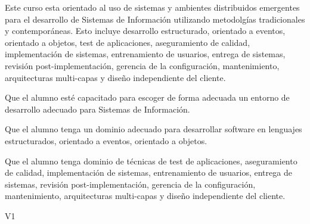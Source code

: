 \begin{syllabus}


\begin{justification}
Este curso esta orientado al uso de sistemas y ambientes distribuidos emergentes para el desarrollo de Sistemas de Información utilizando metodolgías tradicionales y contemporáneas. Esto incluye desarrollo estructurado, orientado a eventos, orientado a objetos, test de aplicaciones, aseguramiento de calidad, implementación de sistemas, entrenamiento de usuarios, entrega de sistemas, revisión post-implementación, gerencia de la configuración, mantenimiento, arquitecturas multi-capas y diseño independiente del cliente.
\end{justification}

\begin{goals}
\item Que el alumno esté capacitado para escoger de forma adecuada un entorno de desarrollo adecuado para Sistemas de Información.
\item Que el alumno tenga un dominio adecuado para desarrollar software en lenguajes estructurados, orientado a eventos, orientado a objetos.
\item Que el alumno tenga dominio de técnicas de test de aplicaciones, aseguramiento de calidad, implementación de sistemas, entrenamiento de usuarios, entrega de sistemas, revisión post-implementación, gerencia de la configuración, mantenimiento, arquitecturas multi-capas y diseño independiente del cliente.
\end{goals}

\begin{outcomes}{V1}
\end{outcomes}


\end{syllabus}
